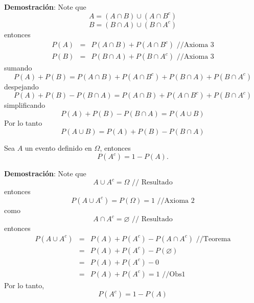 \textbf{Demostración}: Note que 
\begin{equation*}
A=(A\cap B)\cup (A\cap B^{c})
\end{equation*}
\begin{equation*}
B=(B\cap A)\cup (B\cap A^{c})
\end{equation*}
entonces
\begin{eqnarray*}
P(A) &=&P(A\cap B)+P(A\cap B^{c})\text{ //Axioma 3} \\
P(B) &=&P(B\cap A)+P(B\cap A^{c})\text{ //Axioma 3}
\end{eqnarray*}
sumando
\begin{equation*}
P(A)+P(B)=P(A\cap B)+P(A\cap B^{c})+P(B\cap A)+P(B\cap A^{c})
\end{equation*}
despejando
\begin{equation*}
P(A)+P(B)-P(B\cap A)=P(A\cap B)+P(A\cap B^{c})+P(B\cap A^{c})
\end{equation*}
simplificando
\begin{equation*}
P(A)+P(B)-P(B\cap A)=P(A\cup B)
\end{equation*}%
Por lo tanto 
\begin{equation*}
P(A\cup B)=P(A)+P(B)-P(B\cap A)
\end{equation*}

\begin{theorem}
Sea $A$ un evento definido en $\Omega$, entonces 
\begin{equation*}
P(A^{c})=1-P(A).
\end{equation*}
\end{theorem}

\textbf{Demostración}: Note que 
\begin{equation*}
A\cup A^{c}=\Omega \text{ // Resultado}
\end{equation*}
entonces
\begin{equation}
P(A\cup A^{c})=P(\Omega )=1\text{ //Axioma 2}  \tag{ Obs1}
\end{equation}
como 
\begin{equation*}
A\cap A^{c}=\varnothing \text{ // Resultado}
\end{equation*}
entonces
\begin{eqnarray*}
P(A\cup A^{c}) &=&P(A)+P(A^{c})-P(A\cap A^{c})\text{ //Teorema} \\
&=&P(A)+P(A^{c})-P(\varnothing ) \\
&=&P(A)+P(A^{c})-0 \\
&=&P(A)+P(A^{c})=1\text{ //Obs1}
\end{eqnarray*}
Por lo tanto, 
\begin{equation*}
P(A^{c})=1-P(A)
\end{equation*}

